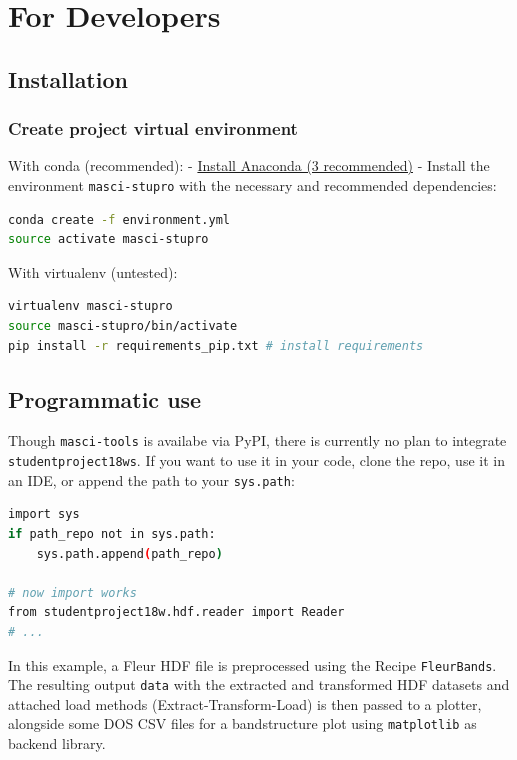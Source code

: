 \section{For Developers}\label{for-developers}

\subsection{Installation}\label{installation-1}

\subsubsection{Create project virtual
environment}\label{create-project-virtual-environment}

With conda (recommended): -
\href{https://www.anaconda.com/download}{Install Anaconda (3
recommended)} - Install the environment \texttt{masci-stupro} with the
necessary and recommended dependencies:

\begin{lstlisting}[language=bash, style=code]
conda create -f environment.yml
source activate masci-stupro
\end{lstlisting}

With virtualenv (untested):

\begin{lstlisting}[language=bash, style=code]
virtualenv masci-stupro
source masci-stupro/bin/activate
pip install -r requirements_pip.txt # install requirements
\end{lstlisting}

\subsection{Programmatic use}\label{programmatic-use}

Though \texttt{masci-tools} is availabe via PyPI, there is currently no
plan to integrate \texttt{studentproject18ws}. If you want to use it in
your code, clone the repo, use it in an IDE, or append the path to your
\texttt{sys.path}:

\begin{lstlisting}[language=bash, style=code]
import sys
if path_repo not in sys.path:
    sys.path.append(path_repo)
    
# now import works
from studentproject18w.hdf.reader import Reader
# ...
\end{lstlisting}

In this example, a Fleur HDF file is preprocessed using the Recipe
\texttt{FleurBands}. The resulting output \texttt{data} with the
extracted and transformed HDF datasets and attached load methods
(Extract-Transform-Load) is then passed to a plotter, alongside some DOS
CSV files for a bandstructure plot using \texttt{matplotlib} as backend
library.

